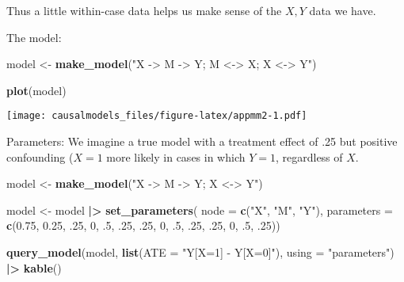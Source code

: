 \documentclass[
  12pt,
]{book}
\newenvironment{Shaded}{\begin{snugshade}}{\end{snugshade}}
\newcommand{\AttributeTok}[1]{\textcolor[rgb]{0.13,0.29,0.53}{#1}}
\newcommand{\DecValTok}[1]{\textcolor[rgb]{0.00,0.00,0.81}{#1}}
\newcommand{\FloatTok}[1]{\textcolor[rgb]{0.00,0.00,0.81}{#1}}
\newcommand{\FunctionTok}[1]{\textcolor[rgb]{0.13,0.29,0.53}{\textbf{#1}}}
\newcommand{\NormalTok}[1]{#1}
\newcommand{\OtherTok}[1]{\textcolor[rgb]{0.56,0.35,0.01}{#1}}
\newcommand{\SpecialCharTok}[1]{\textcolor[rgb]{0.81,0.36,0.00}{\textbf{#1}}}
\newcommand{\StringTok}[1]{\textcolor[rgb]{0.31,0.60,0.02}{#1}}
\begin{document}
Thus a little within-case data helps us make sense of the \(X,Y\) data we have.

The model:

\begin{Shaded}
\begin{Highlighting}[]
\NormalTok{model }\OtherTok{\textless{}{-}} 
  \FunctionTok{make\_model}\NormalTok{(}\StringTok{"X {-}\textgreater{} M {-}\textgreater{} Y; M \textless{}{-}\textgreater{} X; X \textless{}{-}\textgreater{} Y"}\NormalTok{) }

\FunctionTok{plot}\NormalTok{(model)}
\end{Highlighting}
\end{Shaded}

\texttt{[image: causalmodels\_files/figure-latex/appmm2-1.pdf]}

Parameters: We imagine a true model with a treatment effect of .25 but positive confounding (\(X=1\) more likely in cases in which \(Y=1\), regardless of \(X\).

\begin{Shaded}
\begin{Highlighting}[]
\NormalTok{model }\OtherTok{\textless{}{-}} 
  \FunctionTok{make\_model}\NormalTok{(}\StringTok{"X {-}\textgreater{} M {-}\textgreater{} Y;  X \textless{}{-}\textgreater{} Y"}\NormalTok{) }

\NormalTok{model }\OtherTok{\textless{}{-}}\NormalTok{ model }\SpecialCharTok{|\textgreater{}}  
  \FunctionTok{set\_parameters}\NormalTok{(}
       \AttributeTok{node =} \FunctionTok{c}\NormalTok{(}\StringTok{"X"}\NormalTok{, }\StringTok{"M"}\NormalTok{, }\StringTok{"Y"}\NormalTok{),}
       \AttributeTok{parameters =} \FunctionTok{c}\NormalTok{(}\FloatTok{0.75}\NormalTok{, }\FloatTok{0.25}\NormalTok{,}
\NormalTok{         .}\DecValTok{25}\NormalTok{, }\DecValTok{0}\NormalTok{, .}\DecValTok{5}\NormalTok{, .}\DecValTok{25}\NormalTok{,}
\NormalTok{         .}\DecValTok{25}\NormalTok{, }\DecValTok{0}\NormalTok{, .}\DecValTok{5}\NormalTok{, .}\DecValTok{25}\NormalTok{,}
\NormalTok{         .}\DecValTok{25}\NormalTok{, }\DecValTok{0}\NormalTok{, .}\DecValTok{5}\NormalTok{, .}\DecValTok{25}\NormalTok{))}

\FunctionTok{query\_model}\NormalTok{(model, }\FunctionTok{list}\NormalTok{(}\AttributeTok{ATE =} \StringTok{"Y[X=1] {-} Y[X=0]"}\NormalTok{), }\AttributeTok{using =} \StringTok{"parameters"}\NormalTok{)  }\SpecialCharTok{|\textgreater{}} \FunctionTok{kable}\NormalTok{()}
\end{Highlighting}
\end{Shaded}
\end{document}
